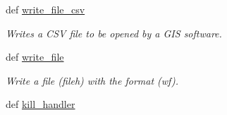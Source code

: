 \begin{DoxyCompactItemize}
def \hyperlink{namespacevagueplaces_a82d499b2844c4caf6e3d29e242edd1d8}{write\-\_\-file\-\_\-csv}
\begin{DoxyCompactList}\small\item\em \-Writes a \-C\-S\-V file to be opened by a \-G\-I\-S software. \end{DoxyCompactList}\item 
def \hyperlink{namespacevagueplaces_aaebf90c401271b3c8426734be3676964}{write\-\_\-file}
\begin{DoxyCompactList}\small\item\em \-Write a file (fileh) with the format (wf). \end{DoxyCompactList}\item 
def \hyperlink{namespacevagueplaces_ae8bd8113632ad176c928b0b2871460c4}{kill\-\_\-handler}
\end{DoxyCompactItemize}
